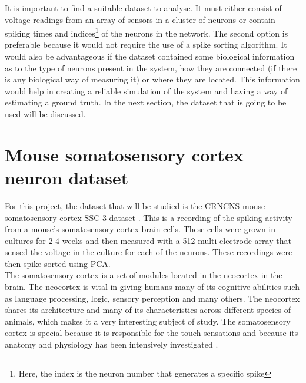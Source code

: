 It is important to find a suitable dataset to analyse. It must either consist of voltage readings from an array of sensors in a cluster of neurons or contain spiking times and indices\footnote{Here, the index is the neuron number that generates a specific spike} of the neurons in the network. The second option is preferable because it would not require the use of a spike sorting algorithm. It would also be advantageous if the dataset contained some biological information as to the type of neurons present in the system, how they are connected (if there is any biological way of measuring it) or where they are located. This information would help in creating a reliable simulation of the system and having a way of estimating a ground truth. In the next section, the dataset that is going to be used will be discussed. 

\section{Mouse somatosensory cortex neuron dataset}\label{sec:mouse_dataset}

For this project, the dataset that will be studied is the CRNCNS mouse somatosensory cortex SSC-3 dataset \cite{ito2016spontaneous, ito2014large, litke2004does}. This is a recording of the spiking activity from a mouse's somatosensory cortex brain cells. These cells were grown in cultures for 2-4 weeks and then measured with a 512 multi-electrode array that sensed the voltage in the culture for each of the neurons. These recordings were then spike sorted using PCA. \\

The somatosensory cortex is a set of modules located in the neocortex in the brain. The neocortex is vital in giving humans many of its cognitive abilities such as language processing, logic, sensory perception and many others. The neocortex shares its architecture and many of its characteristics across different species of animals, which makes it a very interesting subject of study. The somatosensory cortex is special because it is responsible for the touch sensations and because its anatomy and physiology has been intensively investigated \cite{markram2015reconstruction}.\\

